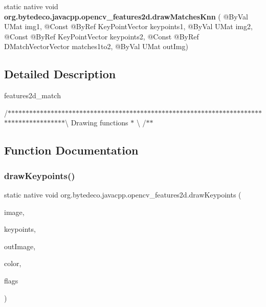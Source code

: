 \begin{DoxyCompactItemize}
\item 
\mbox{\label{group__features2d__draw_ga268c83c6ccf79fda325ae1f5d350ba02}} 
static native void {\bfseries org.\+bytedeco.\+javacpp.\+opencv\+\_\+features2d.\+draw\+Matches\+Knn} ( @By\+Val U\+Mat img1, @Const @By\+Ref Key\+Point\+Vector keypoints1, @By\+Val U\+Mat img2, @Const @By\+Ref Key\+Point\+Vector keypoints2, @Const @By\+Ref D\+Match\+Vector\+Vector matches1to2, @By\+Val U\+Mat out\+Img)
\end{DoxyCompactItemize}


\subsection{Detailed Description}
features2d\+\_\+match 

/$\ast$$\ast$$\ast$$\ast$$\ast$$\ast$$\ast$$\ast$$\ast$$\ast$$\ast$$\ast$$\ast$$\ast$$\ast$$\ast$$\ast$$\ast$$\ast$$\ast$$\ast$$\ast$$\ast$$\ast$$\ast$$\ast$$\ast$$\ast$$\ast$$\ast$$\ast$$\ast$$\ast$$\ast$$\ast$$\ast$$\ast$$\ast$$\ast$$\ast$$\ast$$\ast$$\ast$$\ast$$\ast$$\ast$$\ast$$\ast$$\ast$$\ast$$\ast$$\ast$$\ast$$\ast$$\ast$$\ast$$\ast$$\ast$$\ast$$\ast$$\ast$$\ast$$\ast$$\ast$$\ast$$\ast$$\ast$$\ast$$\ast$$\ast$$\ast$$\ast$$\ast$$\ast$$\ast$$\ast$$\ast$$\ast$$\ast$$\ast$$\ast$$\ast$$\ast$$\ast$$\ast$$\ast$$\ast$$\ast$\textbackslash{} Drawing functions $\ast$ \textbackslash{} /$\ast$$\ast$ 

\subsection{Function Documentation}
\mbox{\label{group__features2d__draw_gab17ce5fe7286fa915dae6cdf8cb80740}} 
\subsubsection{\texorpdfstring{draw\+Keypoints()}{drawKeypoints()}}
{\footnotesize\ttfamily static native void org.\+bytedeco.\+javacpp.\+opencv\+\_\+features2d.\+draw\+Keypoints (\begin{DoxyParamCaption}\item[{@By\+Val Mat}]{image,  }\item[{@Const @By\+Ref Key\+Point\+Vector}]{keypoints,  }\item[{@By\+Val Mat}]{out\+Image,  }\item[{@Const @By\+Ref(null\+Value=\char`\"{}cv\+::\+Scalar\+::all(-\/1)\char`\"{}) Scalar}]{color,  }\item[{int}]{flags }\end{DoxyParamCaption})\hspace{0.3cm}{\ttfamily [static]}}



